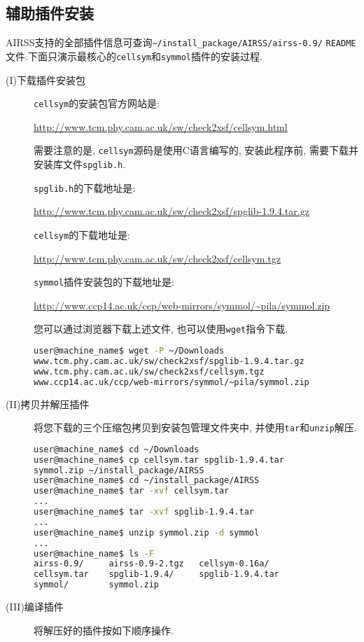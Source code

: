 \documentclass[a4paper, 10pt]{article}
\begin{document}
\subsection{辅助插件安装}
AIRSS支持的全部插件信息可查询\verb|~/install_package/AIRSS/airss-0.9/|
\verb|README|文件.下面只演示最核心的\verb|cellsym|和\verb|symmol|插件的安装过程.
\begin{description}
\item[(I)下载插件安装包]
\verb|cellsym|的安装包官方网站是:

\url{http://www.tcm.phy.cam.ac.uk/sw/check2xsf/cellsym.html}

需要注意的是, \verb|cellsym|源码是使用C语言编写的, 安装此程序前, 需要下载并安装库文件\verb|spglib.h|.

\verb|spglib.h|的下载地址是:

\url{http://www.tcm.phy.cam.ac.uk/sw/check2xsf/spglib-1.9.4.tar.gz}

\verb|cellsym|的下载地址是:

\url{http://www.tcm.phy.cam.ac.uk/sw/check2xsf/cellsym.tgz}

\verb|symmol|插件安装包的下载地址是:

\url{http://www.ccp14.ac.uk/ccp/web-mirrors/symmol/~pila/symmol.zip}

您可以通过浏览器下载上述文件, 也可以使用\verb|wget|指令下载.
\begin{lstlisting}[language={bash}]
user@machine_name$ wget -P ~/Downloads 
www.tcm.phy.cam.ac.uk/sw/check2xsf/spglib-1.9.4.tar.gz 
www.tcm.phy.cam.ac.uk/sw/check2xsf/cellsym.tgz 
www.ccp14.ac.uk/ccp/web-mirrors/symmol/~pila/symmol.zip
\end{lstlisting}

\item[(II)拷贝并解压插件]将您下载的三个压缩包拷贝到安装包管理文件夹中, 并使用\verb|tar|和\verb|unzip|解压.
\begin{lstlisting}[language={bash}]
user@machine_name$ cd ~/Downloads
user@machine_name$ cp cellsym.tar spglib-1.9.4.tar 
symmol.zip ~/install_package/AIRSS
user@machine_name$ cd ~/install_package/AIRSS
user@machine_name$ tar -xvf cellsym.tar
...
user@machine_name$ tar -xvf spglib-1.9.4.tar
...
user@machine_name$ unzip symmol.zip -d symmol
...
user@machine_name$ ls -F
airss-0.9/     airss-0.9-2.tgz   cellsym-0.16a/  
cellsym.tar    spglib-1.9.4/     spglib-1.9.4.tar  
symmol/        symmol.zip
\end{lstlisting}

\item[(III)编译插件]将解压好的插件按如下顺序操作.


\end{description}
\end{document}
